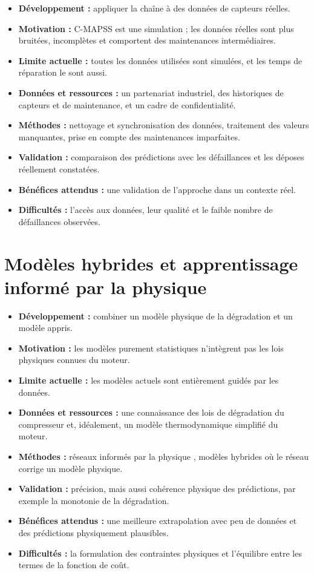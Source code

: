 \begin{itemize}
\item \textbf{Développement :} appliquer la chaîne à des données de capteurs réelles.
\item \textbf{Motivation :} C-MAPSS est une simulation ; les données réelles sont plus bruitées, incomplètes et comportent des maintenances intermédiaires.
\item \textbf{Limite actuelle :} toutes les données utilisées sont simulées, et les temps de réparation le sont aussi.
\item \textbf{Données et ressources :} un partenariat industriel, des historiques de capteurs et de maintenance, et un cadre de confidentialité.
\item \textbf{Méthodes :} nettoyage et synchronisation des données, traitement des valeurs manquantes, prise en compte des maintenances imparfaites.
\item \textbf{Validation :} comparaison des prédictions avec les défaillances et les déposes réellement constatées.
\item \textbf{Bénéfices attendus :} une validation de l'approche dans un contexte réel.
\item \textbf{Difficultés :} l'accès aux données, leur qualité et le faible nombre de défaillances observées.
\end{itemize}

\section{Modèles hybrides et apprentissage informé par la physique}\label{sec:p-hybride}

\begin{itemize}
\item \textbf{Développement :} combiner un modèle physique de la dégradation et un modèle appris.
\item \textbf{Motivation :} les modèles purement statistiques n'intègrent pas les lois physiques connues du moteur.
\item \textbf{Limite actuelle :} les modèles actuels sont entièrement guidés par les données.
\item \textbf{Données et ressources :} une connaissance des lois de dégradation du compresseur et, idéalement, un modèle thermodynamique simplifié du moteur.
\item \textbf{Méthodes :} réseaux informés par la physique \cite{raissi2019}, modèles hybrides où le réseau corrige un modèle physique.
\item \textbf{Validation :} précision, mais aussi cohérence physique des prédictions, par exemple la monotonie de la dégradation.
\item \textbf{Bénéfices attendus :} une meilleure extrapolation avec peu de données et des prédictions physiquement plausibles.
\item \textbf{Difficultés :} la formulation des contraintes physiques et l'équilibre entre les termes de la fonction de coût.
\end{itemize}

